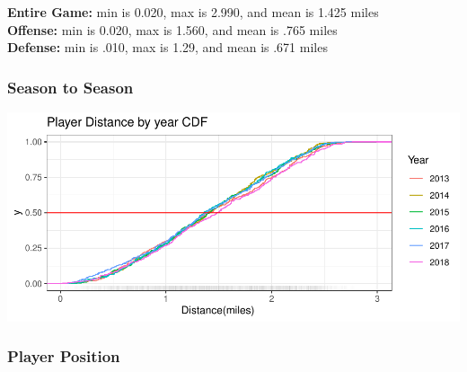 \documentclass[
]{article}
\begin{document}
\textbf{Entire Game:} min is 0.020, max is 2.990, and mean is 1.425
miles\\
\textbf{Offense:} min is 0.020, max is 1.560, and mean is .765 miles\\
\textbf{Defense:} min is .010, max is 1.29, and mean is .671 miles

\hypertarget{season-to-season}{%
\subsubsection{Season to Season}\label{season-to-season}}

\includegraphics{EDA_files/figure-latex/unnamed-chunk-2-1.pdf}

\hypertarget{player-position}{%
\subsubsection{Player Position}\label{player-position}}
\end{document}
